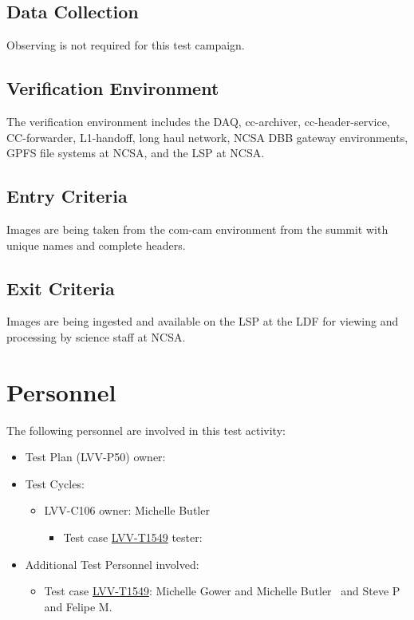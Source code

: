 \documentclass[DM,lsstdraft,STR,toc]{lsstdoc}
\begin{document}
\subsection{Data Collection}

  Observing is not required for this test campaign.

\subsection{Verification Environment}
\label{sect:hwconf}
  The verification environment includes the DAQ, cc-archiver,
cc-header-service, CC-forwarder, L1-handoff, long haul network, NCSA DBB
gateway environments, GPFS file systems at NCSA, and the LSP at NCSA. ~~


  \subsection{Entry Criteria}
  Images are being taken from the com-cam environment from the summit with
unique names and complete headers.~


  \subsection{Exit Criteria}
  Images are being ingested and available on the LSP at the LDF for
viewing and processing by science staff at NCSA.~~



\newpage
\section{Personnel}
\label{sect:personnel}

The following personnel are involved in this test activity:

\begin{itemize}
\item Test Plan (LVV-P50) owner: 
\item Test Cycles:
\begin{itemize}
  \item LVV-C106 owner: 
    Michelle Butler
  \begin{itemize}
    \item Test case \href{https://jira.lsstcorp.org/secure/Tests.jspa#/testCase/LVV-T1549}{LVV-T1549} tester: 
  \end{itemize}
\end{itemize}
\item Additional Test Personnel involved:
  \begin{itemize}
    \item Test case \href{https://jira.lsstcorp.org/secure/Tests.jspa#/testCase/LVV-T1549}{LVV-T1549}: Michelle Gower and Michelle Butler ~and Steve P and Felipe M.~

  \end{itemize}
\end{itemize}
\end{document}

